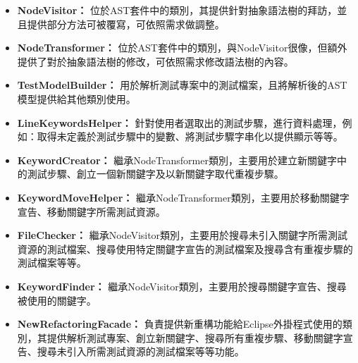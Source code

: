 \begin{itemize}

\item\textbf{NodeVisitor：}
位於AST套件中的類別，其提供針對抽象語法樹的拜訪，並且提供部分方法可被覆寫，可依照需求做調整。

\item\textbf{NodeTransformer：}
位於AST套件中的類別，與NodeVisitor很像，但額外提供了對於抽象語法樹的修改，可依照需求修改語法樹的內容。

\item\textbf{TestModelBuilder：}
用於解析測試專案中的測試檔案，且將解析後的AST模型提供給其他類別使用。

\item\textbf{LineKeywordsHelper：}
針對使用者選取出的測試步驟，進行資料處理，例如：取得未定義於測試步驟中的變數、將測試步驟字串化以提供顯示等等。

\item\textbf{KeywordCreator：}
繼承NodeTransformer類別，主要用於建立新關鍵字中的測試步驟、創立一個新關鍵字及以新關鍵字取代重複步驟。

\item\textbf{KeywordMoveHelper：}
繼承NodeTransformer類別，主要用於移動關鍵字宣告、移動關鍵字所需測試資源。

\item\textbf{FileChecker：}
繼承NodeVisitor類別，主要用於搜尋未引入關鍵字所需測試資源的測試檔案、搜尋使用特定關鍵字宣告的測試檔案及搜尋含有重複步驟的測試檔案等等。

\item\textbf{KeywordFinder：}
繼承NodeVisitor類別，主要用於搜尋關鍵字宣告、搜尋被使用的關鍵字。

\item\textbf{NewRefactoringFacade：}
負責提供新重構功能給Eclipse外掛程式使用的類別，其提供解析測試專案、創立新關鍵字、搜尋所有重複步驟、移動關鍵字宣告、搜尋未引入所需測試資源的測試檔案等等功能。

\end{itemize}

